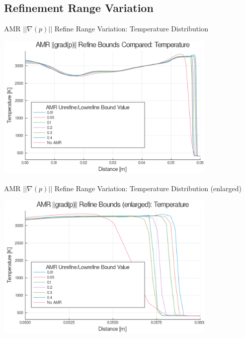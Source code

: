 \subsection{Refinement Range Variation}

\begin{frame}{AMR $|| \nabla (p)||$ Refine Range Variation: Temperature Distribution}
\begin{center}
\includegraphics[width=0.8\textwidth]{../figs/amrfigs/amr_refinebounds/t.png}
\end{center}
\end{frame}

\begin{frame}{AMR $|| \nabla (p)||$ Refine Range Variation: Temperature Distribution (enlarged)}
\begin{center}
\includegraphics[width=0.8\textwidth]{../figs/amrfigs/amr_refinebounds/te.png}
\end{center}
\end{frame}


